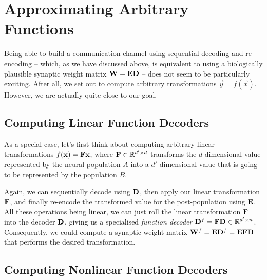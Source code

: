 \documentclass[10pt,letterpaper,oneside]{article}
\begin{document}

	
	\section{Approximating Arbitrary Functions}

	Being able to build a communication channel using sequential decoding and re-encoding -- which, as we have discussed above, is equivalent to using a biologically plausible synaptic weight matrix ${\mathbf{W}} = {\mathbf{E}} {\mathbf{D}}$ -- does not seem to be particularly exciting. After all, we set out to compute arbitrary transformations $\vec y = f(\vec x)$. However, we are actually quite close to our goal.

	\subsection{Computing Linear Function Decoders}

	As a special case, let's first think about computing arbitrary linear transformations $f({\mathbf{x}}) = {\mathbf{F}} {\mathbf{x}}$, where ${\mathbf{F}} \in \mathbb{R}^{d' \times d}$ transforms the $d$-dimensional value represented by the neural population $A$ into a $d'$-dimensional value that is going to be represented by the population $B$.

	Again, we can sequentially decode using ${\mathbf{D}}$, then apply our linear transformation ${\mathbf{F}}$, and finally re-encode the transformed value for the post-population using ${\mathbf{E}}$. All these operations being linear, we can just roll the linear transformation ${\mathbf{F}}$ into the decoder ${\mathbf{D}}$, giving us a specialised \emph{function decoder} ${\mathbf{D}}^{f} = {\mathbf{F}} {\mathbf{D}} \in \mathbb{R}^{d' \times n}$. Consequently, we could compute a synaptic weight matrix ${\mathbf{W}}^f = {\mathbf{E}} {\mathbf{D}}^f = {\mathbf{E}} {\mathbf{F}} {\mathbf{D}}$ that performs the desired transformation.

	\subsection{Computing Nonlinear Function Decoders}
\end{document}
